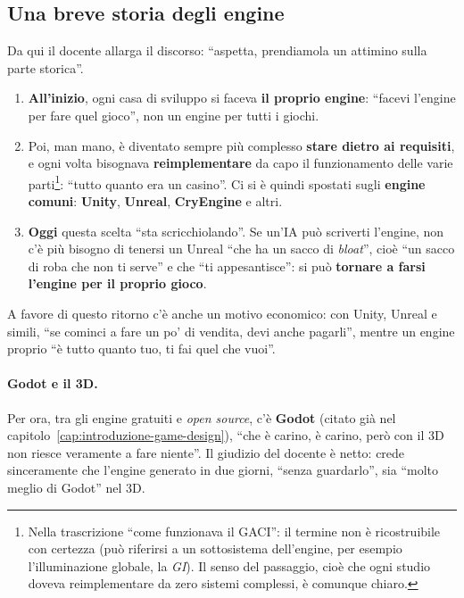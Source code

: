 \subsection{Una breve storia degli engine}

Da qui il docente allarga il discorso: ``aspetta, prendiamola un attimino
sulla parte storica''.
\begin{enumerate}
  \item \textbf{All'inizio}, ogni casa di sviluppo si faceva \textbf{il proprio
        engine}: ``facevi l'engine per fare quel gioco'', non un engine per
        tutti i giochi.
  \item Poi, man mano, è diventato sempre più complesso \textbf{stare dietro ai
        requisiti}, e ogni volta bisognava \textbf{reimplementare} da capo il
        funzionamento delle varie parti\footnote{Nella trascrizione ``come
        funzionava il GACI'': il termine non è ricostruibile con certezza (può
        riferirsi a un sottosistema dell'engine, per esempio
        l'illuminazione globale, la \emph{GI}). Il senso del passaggio, cioè
        che ogni studio doveva reimplementare da zero sistemi complessi, è
        comunque chiaro.}: ``tutto quanto era un casino''. Ci si è quindi
        spostati sugli \textbf{engine comuni}: \textbf{Unity},
        \textbf{Unreal}, \textbf{CryEngine} e altri.
  \item \textbf{Oggi} questa scelta ``sta scricchiolando''. Se un'IA può
        scriverti l'engine, non c'è più bisogno di tenersi un Unreal ``che ha un
        sacco di \emph{bloat}'', cioè ``un sacco di roba che non ti serve'' e
        che ``ti appesantisce'': si può \textbf{tornare a farsi l'engine per il
        proprio gioco}.
\end{enumerate}
A favore di questo ritorno c'è anche un motivo economico: con Unity, Unreal e
simili, ``se cominci a fare un po' di vendita, devi anche pagarli'', mentre un
engine proprio ``è tutto quanto tuo, ti fai quel che vuoi''.

\paragraph{Godot e il 3D.} Per ora, tra gli engine gratuiti e
\emph{open source}, c'è \textbf{Godot} (citato già nel
capitolo~\ref{cap:introduzione-game-design}), ``che è carino, è carino, però con il 3D non
riesce veramente a fare niente''. Il giudizio del docente è netto: crede
sinceramente che l'engine generato in due giorni, ``senza guardarlo'', sia
``molto meglio di Godot'' nel 3D.

